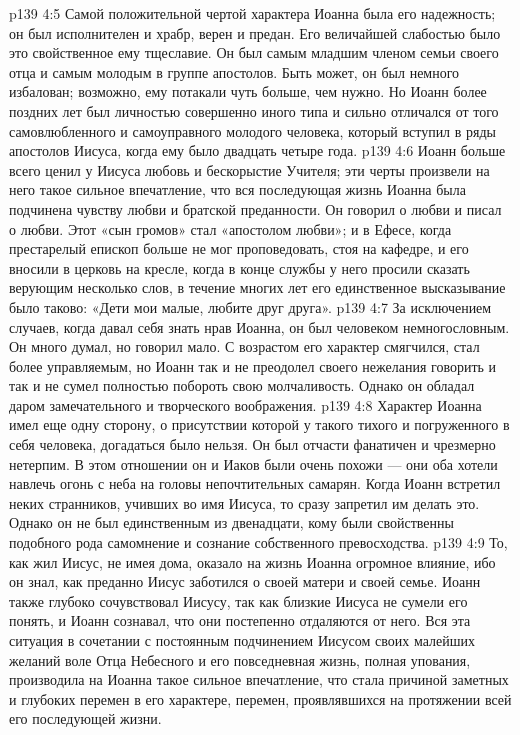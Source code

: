 \vs p139 4:5 Самой положительной чертой характера Иоанна была его надежность; он был исполнителен и храбр, верен и предан. Его величайшей слабостью было это свойственное ему тщеславие. Он был самым младшим членом семьи своего отца и самым молодым в группе апостолов. Быть может, он был немного избалован; возможно, ему потакали чуть больше, чем нужно. Но Иоанн более поздних лет был личностью совершенно иного типа и сильно отличался от того самовлюбленного и самоуправного молодого человека, который вступил в ряды апостолов Иисуса, когда ему было двадцать четыре года.
\vs p139 4:6 \pc Иоанн больше всего ценил у Иисуса любовь и бескорыстие Учителя; эти черты произвели на него такое сильное впечатление, что вся последующая жизнь Иоанна была подчинена чувству любви и братской преданности. Он говорил о любви и писал о любви. Этот «сын громов» стал «апостолом любви»; и в Ефесе, когда престарелый епископ больше не мог проповедовать, стоя на кафедре, и его вносили в церковь на кресле, когда в конце службы у него просили сказать верующим несколько слов, в течение многих лет его единственное высказывание было таково: «Дети мои малые, любите друг друга».
\vs p139 4:7 \pc За исключением случаев, когда давал себя знать нрав Иоанна, он был человеком немногословным. Он много думал, но говорил мало. С возрастом его характер смягчился, стал более управляемым, но Иоанн так и не преодолел своего нежелания говорить и так и не сумел полностью побороть свою молчаливость. Однако он обладал даром замечательного и творческого воображения.
\vs p139 4:8 \pc Характер Иоанна имел еще одну сторону, о присутствии которой у такого тихого и погруженного в себя человека, догадаться было нельзя. Он был отчасти фанатичен и чрезмерно нетерпим. В этом отношении он и Иаков были очень похожи --- они оба хотели навлечь огонь с неба на головы непочтительных самарян. Когда Иоанн встретил неких странников, учивших во имя Иисуса, то сразу запретил им делать это. Однако он не был единственным из двенадцати, кому были свойственны подобного рода самомнение и сознание собственного превосходства.
\vs p139 4:9 То, как жил Иисус, не имея дома, оказало на жизнь Иоанна огромное влияние, ибо он знал, как преданно Иисус заботился о своей матери и своей семье. Иоанн также глубоко сочувствовал Иисусу, так как близкие Иисуса не сумели его понять, и Иоанн сознавал, что они постепенно отдаляются от него. Вся эта ситуация в сочетании с постоянным подчинением Иисусом своих малейших желаний воле Отца Небесного и его повседневная жизнь, полная упования, производила на Иоанна такое сильное впечатление, что стала причиной заметных и глубоких перемен в его характере, перемен, проявлявшихся на протяжении всей его последующей жизни.
